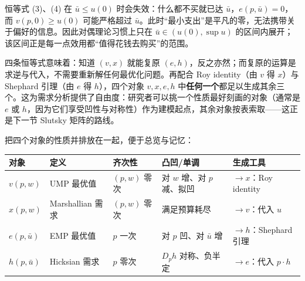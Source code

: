 \begin{remark}
恒等式 (3)、(4) 在 $\bar u\le u(0)$ 时会失效：什么都不买就已达 $\bar u$，$e(p,\bar u)=0$，而 $v(p,0)\ge u(0)$ 可能严格超过 $\bar u$。此时“最小支出”是平凡的零，无法携带关于偏好的信息。因此对偶理论习惯上只在 $\bar u\in(u(0),\sup u)$ 的区间内展开；该区间正是每一点效用都“值得花钱去购买”的范围。
\end{remark}

\begin{remark}[对偶性的方法论意义]
四条恒等式意味着：知道 $(v,x)$ 就能复原 $(e,h)$，反之亦然；而复原的运算是求逆与代入，不需要重新解任何最优化问题。再配合 Roy identity（由 $v$ 得 $x$）与 Shephard 引理（由 $e$ 得 $h$），四个对象 $v,x,e,h$ 中\textbf{任何一个}都足以生成其余三个。这为需求分析提供了自由度：研究者可以挑一个性质最好刻画的对象（通常是 $e$ 或 $h$，因为它们享受凹性与对称性）作为建模起点，其余对象按表索取——这正是下一节 Slutsky 矩阵的路线。
\end{remark}

把四个对象的性质并排放在一起，便于总览与记忆：

\begin{center}
\begin{tabular}{lllll}
\toprule
对象 & 定义 & 齐次性 & 凸凹/单调 & 生成工具\\
\midrule
$v(p,w)$ & UMP 最优值 & $(p,w)$ 零次 & 对 $w$ 增、对 $p$ 减、拟凹 & $\to x$：Roy identity\\
$x(p,w)$ & Marshallian 需求 & $(p,w)$ 零次 & 满足预算耗尽 & $\to v$：代入 $u$\\
$e(p,\bar u)$ & EMP 最优值 & $p$ 一次 & 对 $p$ 凹、对 $\bar u$ 增 & $\to h$：Shephard 引理\\
$h(p,\bar u)$ & Hicksian 需求 & $p$ 零次 & $D_ph$ 对称、负半定 & $\to e$：代入 $p\cdot h$\\
\bottomrule
\end{tabular}
\end{center}
